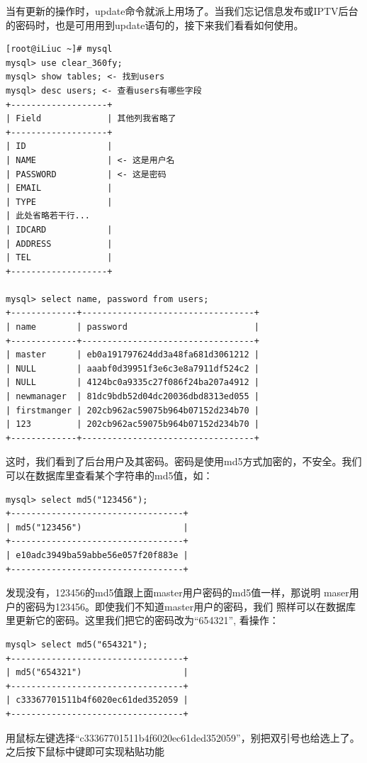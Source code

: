 当有更新的操作时，update命令就派上用场了。当我们忘记信息发布或IPTV后台
的密码时，也是可用用到update语句的，接下来我们看看如何使用。

\small{
\begin{verbatim}
[root@iLiuc ~]# mysql
mysql> use clear_360fy;
mysql> show tables; <- 找到users
mysql> desc users; <- 查看users有哪些字段
+-------------------+
| Field             | 其他列我省略了
+-------------------+
| ID                |
| NAME              | <- 这是用户名
| PASSWORD          | <- 这是密码
| EMAIL             |
| TYPE              |
| 此处省略若干行...
| IDCARD            |
| ADDRESS           |
| TEL               |
+-------------------+

mysql> select name, password from users;
+-------------+----------------------------------+
| name        | password                         |
+-------------+----------------------------------+
| master      | eb0a191797624dd3a48fa681d3061212 | 
| NULL        | aaabf0d39951f3e6c3e8a7911df524c2 | 
| NULL        | 4124bc0a9335c27f086f24ba207a4912 | 
| newmanager  | 81dc9bdb52d04dc20036dbd8313ed055 | 
| firstmanger | 202cb962ac59075b964b07152d234b70 | 
| 123         | 202cb962ac59075b964b07152d234b70 | 
+-------------+----------------------------------+
\end{verbatim}
}
\normalsize

这时，我们看到了后台用户及其密码。密码是使用md5方式加密的，不安全。我们
可以在数据库里查看某个字符串的md5值，如：

\small{
\begin{verbatim}
mysql> select md5("123456");
+----------------------------------+
| md5("123456")                    |
+----------------------------------+
| e10adc3949ba59abbe56e057f20f883e | 
+----------------------------------+
\end{verbatim}
}
\normalsize

发现没有，123456的md5值跟上面master用户密码的md5值一样，那说明
maser用户的密码为123456。即使我们不知道master用户的密码，我们
照样可以在数据库里更新它的密码。这里我们把它的密码改为“654321”,
看操作：

\small{
\begin{verbatim}
mysql> select md5("654321");
+----------------------------------+
| md5("654321")                    |
+----------------------------------+
| c33367701511b4f6020ec61ded352059 | 
+----------------------------------+
\end{verbatim}
}
\normalsize

用鼠标左键选择“c33367701511b4f6020ec61ded352059”，别把双引号也给选上了。
之后按下鼠标中键即可实现粘贴功能

